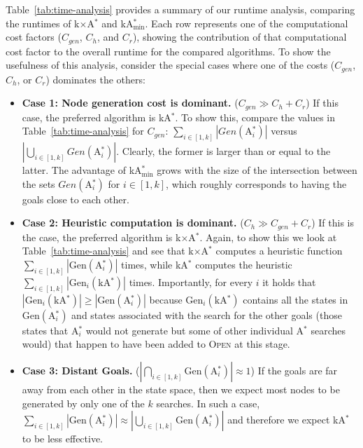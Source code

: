 \documentclass[smallextended]{svjour3}       %
\newcommand{\astar}{A$^*$\xspace}
\newcommand{\kastar}{kA$^*$\xspace}
\newcommand{\kastarvar}[1]{\textup{kA}$^*_{#1}$\xspace}
\newcommand{\kastarmin}{\kastarvar{\min}}
\newcommand{\kxastar}{k$\times$A$^*$\xspace}
\newcommand{\astari}[1]{A$^*_{#1}$\xspace}
\newcommand{\Gen}{\text{Gen}}
\newcommand{\open}{\textsc{Open}\xspace}
\begin{document}
Table~\ref{tab:time-analysis} provides a summary of our runtime analysis, comparing the runtimes of \kxastar and \kastarmin.
Each row represents one of the computational cost factors ($C_{gen}$, $C_{h}$, and $C_{r}$), showing the contribution of that computational cost factor to the overall runtime for the compared algorithms.
To show the usefulness of this analysis, consider the special cases where one of the costs ($C_{gen}$, $C_{h}$, or $C_{r}$) dominates the others:
\begin{itemize}
  \item \textbf{Case 1: Node generation cost is dominant.} ($C_{gen}\gg C_{h}+C_r$)
  If this case, the preferred algorithm is \kastar.
  To show this, compare the values in Table~\ref{tab:time-analysis} for $C_{gen}$: $\sum_{i\in[1,k]} |Gen(\text{\astari{i}})|$ versus $|\bigcup_{i\in[1,k]} Gen(\text{\astari{i}})|$.
  Clearly, the former is larger than or equal to the latter.
  The advantage of \kastarmin grows with the size of the intersection between the sets $Gen(\text{\astari{i}})$ for $i\in[1,k]$, which roughly corresponds to having the goals close to each other. 

  \item \textbf{Case 2: Heuristic computation is dominant.} ($C_{h}\gg C_{gen}+C_r$)
    If this is the case, the preferred algorithm is \kxastar.
    Again, to show this we look at Table~\ref{tab:time-analysis} and see that \kxastar computes a heuristic function $\sum_{i\in[1,k]} |\Gen(\text{\astari{i}})|$ times, while \kastar computes the heuristic $\sum_{i\in[1,k]} |\Gen_i(\text{\kastar})|$ times.
    Importantly, for every $i$ it holds that $|\Gen_i(\text{\kastar})|\geq |\Gen(\text{\astari{i}})|$ because $\Gen_i(\text{\kastar})$ contains all the states in $\Gen(\text{\astari{i}})$ and states associated with the search for the other goals (those states that \astari{i} would not generate but some of other individual \astar searches would) that happen to have been added to \open at this stage.

   \item \textbf{Case 3: Distant Goals.} ($|\bigcap\limits_{i\in[1,k]} \Gen(\text{\astari{i}})|\approx 1$)
   If the goals are far away from each other in the state space, then we expect most nodes to be generated by only one of the $k$ searches.
   In such a case, $\sum\limits_{i\in[1,k]}|\Gen(\text{\astari{i}})|\approx |\bigcup\limits_{i\in[1,k]} \Gen(\text{\astari{i}})|$ and therefore we expect \kastar to be less effective.
\end{itemize}
\end{document}
